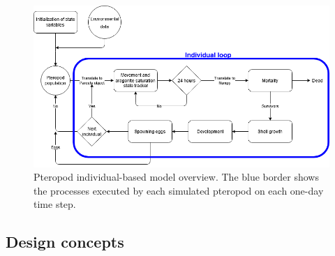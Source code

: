 \begin{figure}[tbh!]
    \centering
    
        \includegraphics[width=\textwidth]{images/Flow_chart_simple_horizontal.png}
       
    
    \caption{Pteropod individual-based model overview. The blue border shows the processes executed by each simulated pteropod on each one-day time step. }
    \label{fig:flow_chart}
\end{figure}


 

\subsection{Design concepts}\label{sec:design_concepts}

